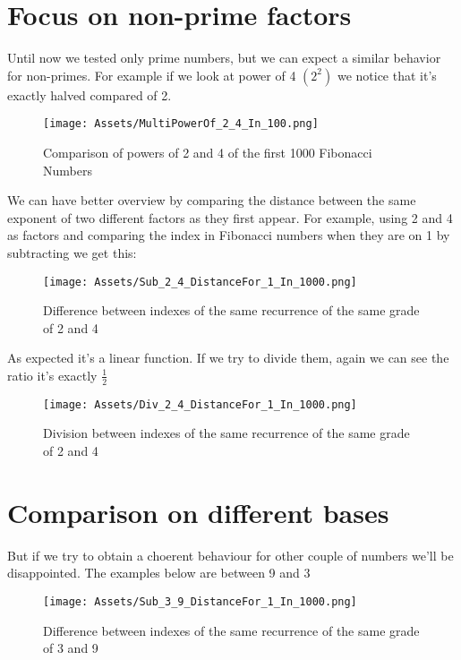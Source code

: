 \documentclass[amsmath,amssymb,aps,pra,reprint,groupedaddress,showpacs]{revtex4-1}
\begin{document}

\section{Focus on non-prime factors}

Until now we tested only prime numbers, but we can expect a similar behavior for non-primes.
For example if we look at power of 4 $(2^2)$ we notice that it's exactly halved compared of 2. 

\begin{figure}[H]
\centering
\texttt{[image: Assets/MultiPowerOf\_2\_4\_In\_100.png]}
\caption{Comparison of powers of 2 and 4 of the first 1000 Fibonacci Numbers}
\end{figure}

We can have better overview by comparing the distance between the same exponent of two different factors 
as they first appear. For example, using 2 and 4 as factors and comparing the index in Fibonacci numbers
when they are on 1 by subtracting we get this:

\begin{figure}[H]
\centering
\texttt{[image: Assets/Sub\_2\_4\_DistanceFor\_1\_In\_1000.png]}
\caption{Difference between indexes of the same recurrence of the same grade of 2 and 4}
\end{figure}

As expected it's a linear function. If we try to divide them, again we can see the ratio it's exactly $\frac{1}{2}$

\begin{figure}[H]
\centering
\texttt{[image: Assets/Div\_2\_4\_DistanceFor\_1\_In\_1000.png]}
\caption{Division between indexes of the same recurrence of the same grade of 2 and 4}
\end{figure}

\section{Comparison on different bases}

But if we try to obtain a choerent behaviour for other couple of numbers we'll be disappointed. The examples below are between 9 and 3

\begin{figure}[H]
\centering
\texttt{[image: Assets/Sub\_3\_9\_DistanceFor\_1\_In\_1000.png]}
\caption{Difference between indexes of the same recurrence of the same grade of 3 and 9}
\end{figure}
\end{document}
